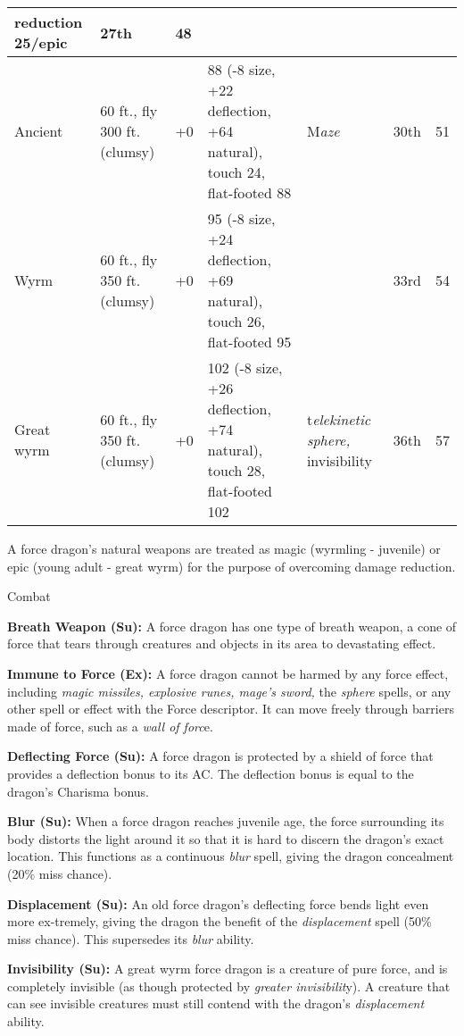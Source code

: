 \documentclass{article}
\begin{document}
\begin{tabular}{|>{\raggedright}p{25pt}|>{\raggedright}p{57pt}|>{\raggedright}p{22pt}|>{\raggedright}p{69pt}|>{\raggedright}p{62pt}|>{\raggedright}p{19pt}|>{\raggedright}p{8pt}|}
{reduction 25/epic} & 2{\small{}7th} & 4{\small{}8}\tabularnewline
\hline
A{\small{}ncient} & 6{\small{}0 ft., fly 300 ft. (clumsy)} & +{\small{}0} & 8{\small{}8 
(-8 size, +22 deflection, +64 natural), touch 24, flat-footed 88} & M{\small{}\textit{aze}} & 3{\small{}0th} & 5{\small{}1}\tabularnewline
\hline
W{\small{}yrm} & 6{\small{}0 ft., fly 350 ft. (clumsy)} & +{\small{}0} & 9{\small{}5 
(-8 size, +24 deflection, +69 natural), touch 26, flat-footed 95} &  & 3{\small{}3rd} & 5{\small{}4}\tabularnewline
\hline
G{\small{}reat wyrm} & 6{\small{}0 ft., fly 350 ft. (clumsy)} & +{\small{}0} & 1{\small{}02 
(-8 size, +26 deflection, +74 natural), touch 28, flat-footed 102} & t{\small{}\textit{elekinetic 
sphere, }}{\small{}invisibility} & 3{\small{}6th} & 5{\small{}7}\tabularnewline
\hline
\end{tabular}

A force dragon's natural weapons are treated as magic (wyrmling - juvenile) or 
epic (young adult - great wyrm) for the purpose of overcoming damage reduction.

Combat\textbf{ }

\textbf{Breath Weapon (Su):} A force dragon has one type of breath weapon, a cone 
of force that tears through creatures and objects in its area to devastating effect. 

\textbf{Immune to Force (Ex):} A force dragon cannot be harmed by any force effect, 
including \textit{magic missiles, explosive runes, mage's sword, }the \textit{sphere 
}spells, or any other spell or effect with the Force descriptor. It can move freely 
through barriers made of force, such as a \textit{wall of forc}e. 

\textbf{Deflecting Force (Su):} A force dragon is protected by a shield of force 
that provides a deflection bonus to its AC. The deflection bonus is equal to the 
dragon's Charisma bonus. 

\textbf{Blur (Su): }When a force dragon reaches juvenile age, the force surrounding 
its body distorts the light around it so that it is hard to discern the dragon's 
exact location. This functions as a continuous \textit{blur }spell, giving the 
dragon concealment (20\% miss chance). 

\textbf{Displacement (Su):} An old force dragon's deflecting force bends light 
even more ex-tremely, giving the dragon the benefit of the \textit{displacement 
}spell (50\% miss chance). This supersedes its \textit{blur }ability. 

\textbf{Invisibility (Su):} A great wyrm force dragon is a creature of pure force, 
and is completely invisible (as though protected by\textit{ greater invisibilit}y). 
A creature that can see invisible creatures must still contend with the dragon's 
\textit{displacement }ability.
\end{document}
